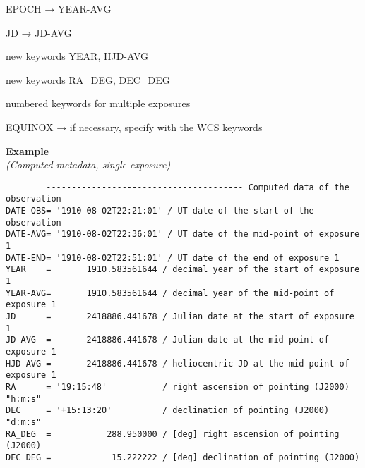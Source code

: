\documentclass[11pt]{ivoa}
\newenvironment{fitsexample}[1]
{\bigskip\noindent\textbf{Example}\\\textit{(#1\smallskip)}}
{\medskip}
\begin{document}
EPOCH → YEAR-AVG

JD → JD-AVG

new keywords YEAR, HJD-AVG

new keywords RA\_DEG, DEC\_DEG

numbered keywords for multiple exposures

EQUINOX → if necessary, specify with the WCS keywords


\begin{fitsexample}{Computed metadata, single exposure}
\begin{lstlisting}
        --------------------------------------- Computed data of the observation
DATE-OBS= '1910-08-02T22:21:01' / UT date of the start of the observation
DATE-AVG= '1910-08-02T22:36:01' / UT date of the mid-point of exposure 1
DATE-END= '1910-08-02T22:51:01' / UT date of the end of exposure 1
YEAR    =       1910.583561644 / decimal year of the start of exposure 1
YEAR-AVG=       1910.583561644 / decimal year of the mid-point of exposure 1
JD      =       2418886.441678 / Julian date at the start of exposure 1
JD-AVG  =       2418886.441678 / Julian date at the mid-point of exposure 1
HJD-AVG =       2418886.441678 / heliocentric JD at the mid-point of exposure 1
RA      = '19:15:48'           / right ascension of pointing (J2000) "h:m:s"
DEC     = '+15:13:20'          / declination of pointing (J2000) "d:m:s"
RA_DEG  =           288.950000 / [deg] right ascension of pointing (J2000)
DEC_DEG =            15.222222 / [deg] declination of pointing (J2000)
\end{lstlisting}
\end{fitsexample}
\end{document}
